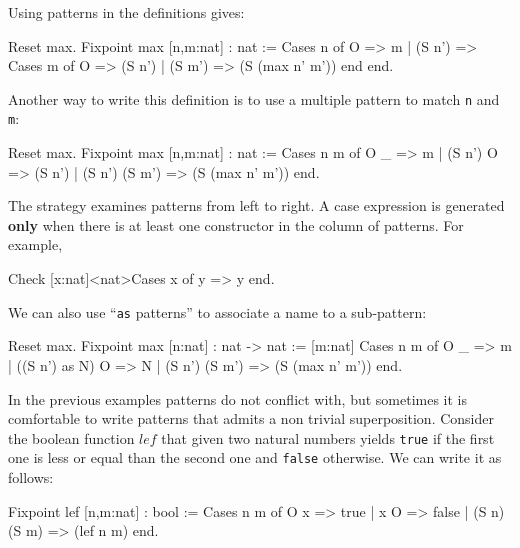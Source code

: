 Using patterns in the definitions gives:

\begin{coq_example}
Reset max.
Fixpoint max [n,m:nat] : nat :=
          Cases n of 
             O     => m
          | (S n') => Cases m of
                         O      => (S n')
                       | (S m') => (S (max n' m'))
                      end
         end.
\end{coq_example}

Another way to write this definition is to use a multiple pattern to
 match    \verb+n+ and \verb+m+:

\begin{coq_example}
Reset max.
Fixpoint max [n,m:nat] : nat :=
          Cases n m of
             O         _  => m   
          | (S n') O      => (S n')
          | (S n') (S m') => (S (max n' m')) 
         end.
\end{coq_example}


The strategy examines patterns 
from left to right. A case expression is generated {\bf only}  when there is at least one constructor in the column of patterns.
For example, 
\begin{coq_example}
Check [x:nat]<nat>Cases x of y => y end.
\end{coq_example}



We can also use ``\verb+as+ patterns'' to associate a name to a
sub-pattern:

\begin{coq_example}
Reset max.
Fixpoint max [n:nat] : nat -> nat :=
  [m:nat] Cases n m of
             O     _         => m   
          | ((S n') as N) O  => N
          | (S n') (S m')    => (S (max n' m')) 
         end.
\end{coq_example}


In the previous examples patterns do not conflict with, but
sometimes it is comfortable to write patterns that admits a non
trivial superposition. Consider
the boolean function $lef$ that given two natural numbers
yields \verb+true+ if the first one is less or equal than the second
one and \verb+false+ otherwise. We can write it as follows:

\begin{coq_example}
Fixpoint lef [n,m:nat] : bool :=
         Cases n m of
             O     x     => true 
          |  x     O     => false 
          | (S n) (S m)  => (lef n m)
         end.
\end{coq_example}

